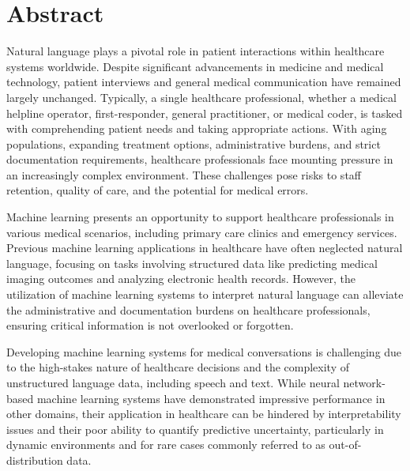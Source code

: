 
\chapter[abstract]{Abstract}

Natural language plays a pivotal role in patient interactions within healthcare systems worldwide. Despite significant advancements in medicine and medical technology, patient interviews and general medical communication have remained largely unchanged. Typically, a single healthcare professional, whether a medical helpline operator, first-responder, general practitioner, or medical coder, is tasked with comprehending patient needs and taking appropriate actions. With aging populations, expanding treatment options, administrative burdens, and strict documentation requirements, healthcare professionals face mounting pressure in an increasingly complex environment. These challenges pose risks to staff retention, quality of care, and the potential for medical errors.

Machine learning presents an opportunity to support healthcare professionals in various medical scenarios, including primary care clinics and emergency services. Previous machine learning applications in healthcare have often neglected natural language, focusing on tasks involving structured data like predicting medical imaging outcomes and analyzing electronic health records. However, the utilization of machine learning systems to interpret natural language can alleviate the administrative and documentation burdens on healthcare professionals, ensuring critical information is not overlooked or forgotten.

Developing machine learning systems for medical conversations is challenging due to the high-stakes nature of healthcare decisions and the complexity of unstructured language data, including speech and text. While neural network-based machine learning systems have demonstrated impressive performance in other domains, their application in healthcare can be hindered by interpretability issues and their poor ability to quantify predictive uncertainty, particularly in dynamic environments and for rare cases commonly referred to as out-of-distribution data.


